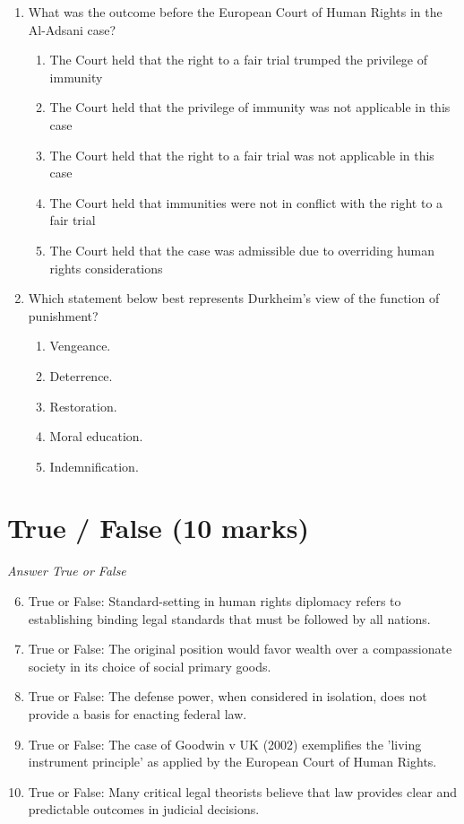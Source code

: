 \documentclass[12pt]{article}
\begin{document}
\begin{enumerate}[label=\arabic*.]
\begin{enumerate}[label=(\alph*)]
\end{enumerate}
\item What was the outcome before the European Court of Human Rights in the Al-Adsani case?
\begin{enumerate}[label=(\alph*)]
    \item The Court held that the right to a fair trial trumped the privilege of immunity
    \item The Court held that the privilege of immunity was not applicable in this case
    \item The Court held that the right to a fair trial was not applicable in this case
    \item The Court held that immunities were not in conflict with the right to a fair trial
    \item The Court held that the case was admissible due to overriding human rights considerations
\end{enumerate}
\item Which statement below best represents Durkheim's view of the function of punishment?
\begin{enumerate}[label=(\alph*)]
    \item Vengeance.
    \item Deterrence.
    \item Restoration.
    \item Moral education.
    \item Indemnification.
\end{enumerate}
\end{enumerate}

\section*{True / False (10 marks)}
\textit{Answer True or False}
\begin{enumerate}[label=\arabic*.]
\setcounter{enumi}{5}
\item True or False: Standard-setting in human rights diplomacy refers to establishing binding legal standards that must be followed by all nations.
\item True or False: The original position would favor wealth over a compassionate society in its choice of social primary goods.
\item True or False: The defense power, when considered in isolation, does not provide a basis for enacting federal law.
\item True or False: The case of Goodwin v UK (2002) exemplifies the 'living instrument principle' as applied by the European Court of Human Rights.
\item True or False: Many critical legal theorists believe that law provides clear and predictable outcomes in judicial decisions.
\end{enumerate}
\end{document}
